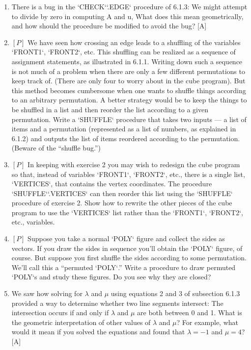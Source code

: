 \documentclass{book}
\begin{document}
\begin{enumerate}
\item There is a bug in the \textsc{`CHECK`}\textsc{`.EDGE`} procedure of 6.1.3: We might
attempt to divide by zero in computing A and u, What does this mean
geometrically, and how should the procedure be modified to avoid the
bug? [A]

\item $[P]$ We have seen how crossing an edge leads to a shuffling of the variables 
\textsc{`FRONT1`}, \textsc{`FRONT2`}, etc. This shuffling can be realized as a sequence
of assignment statements, as illustrated in 6.1.1. Writing down such a
sequence is not much of a problem when there are only a few different
permutations to keep track of. (There are only four to worry about in
the cube program). But this method becomes cumbersome when one
wants to shuffle things according to an arbitrary permutation. A better
strategy would be to keep the things to be shuffled in a list and 
then reorder the list according to a given permutation. Write a \textsc{`SHUFFLE`} procedure
that takes two inputs --- a list of items and a permutation (represented as
a list of numbers, as explained in 6.1.2) and outputs the list of items
reordered according to the permutation. (Beware of the ``shuffle bug.'')

\item $[P]$ In keeping with exercise 2 you may wish to redesign the cube
program so that, instead of variables \textsc{`FRONT1`}, \textsc{`FRONT2`}, etc., there is a
single list, \textsc{`VERTICES`}, that contains the vertex coordinates. 
The procedure \textsc{`SHUFFLE`}\textsc{`.VERTICES`} can then reorder this list using the \textsc{`SHUFFLE`}
procedure of exercise 2. Show how to rewrite the other pieces of the
cube program to use the \textsc{`VERTICES`} list rather than the \textsc{`FRONT1`}, \textsc{`FRONT2`},
etc., variables.

\item $[P]$ Suppose you take a normal \textsc{`POLY`} figure and collect the sides as
vectors. If you draw the sides in sequence you'll obtain the \textsc{`POLY`} figure,
of course. But suppose you first shuffle the sides according to some
permutation. We'll call this a ``permuted \textsc{`POLY`}.'' Write a procedure to
draw permuted \textsc{`POLY`}s and study these figures. Do you see why they are
closed?

\item We saw how solving for $\lambda$ and $\mu$ using equations 2 and 3 of subsection
6.1.3 provided a way to determine whether two line segments intersect:
The intersection occurs if and only if $\lambda$ and $\mu$ are both between 0 and
1. What is the geometric interpretation of other values of $\lambda$ and $\mu$? For
example, what would it mean if you solved the equations and found that
$\lambda = -1$ and $\mu = 4$? [A]


\end{enumerate}
\end{document}
